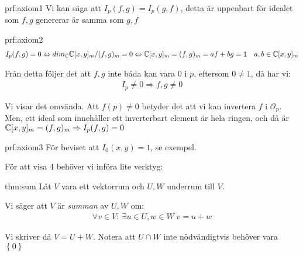 \par\bigskip
\begin{prf}[Axiom 1]{prf:axiom1}
  Vi kan säga att $I_p(f,g) = I_p(g,f)$, detta är uppenbart för idealet som $f,g$ genererar är samma som $g,f$ 
\end{prf}
\par\bigskip
\begin{prf}[Axiom 2]{prf:axiom2}
  \begin{equation*}
    \begin{gathered}
      I_p(f,g) = 0\Leftrightarrow dim_{\mathbb{C}} \mathbb{C}[x,y]_m/(f,g)_m = 0\Leftrightarrow \mathbb{C}[x,y]_m = (f,g)_m = af+bg=1\quad a,b\in\mathbb{C}[x,y]_m
    \end{gathered}
  \end{equation*}\par
  \noindent Från detta följer det att $f,g$ inte båda kan vara 0 i $p$, eftersom $0\neq1$, då har vi:
  \begin{equation*}
    \begin{gathered}
      I_p\neq0 \Rightarrow f,g\neq0
    \end{gathered}
  \end{equation*}
  \par\bigskip
  \noindent Vi visar det omvända. Att $f(p)\neq0$ betyder det att vi kan invertera $f$ i $\mathcal{O}_p$. Men, ett ideal som innehåller ett inverterbart element är hela ringen, och då är $\mathbb{C}[x,y]_m=(f,g)_m\Rightarrow I_p(f,g)=0$
\end{prf}
\par\bigskip
\begin{prf}[Axiom 3]{prf:axiom3}
  För beviset att $I_0(x,y) = 1$, se exempel.
\end{prf}
\par\bigskip
\noindent För att visa 4 behöver vi införa lite verktyg:
\par\bigskip
\begin{theo}[Summa]{thm:sum}
  Låt $V$ vara ett vektorrum och $U, W$ underrum till $V$.
  \par\bigskip
  \noindent Vi säger att $V$ är \textit{summan} av $U,W$ om:
  \begin{equation*}
    \begin{gathered}
      \forall v\in V:\:\exists u\in U,w\in W\; v = u+w
    \end{gathered}
  \end{equation*}\par
\noindent Vi skriver då $V = U+W$. Notera att $U\cap W$ inte nödvändigtvis behöver vara $\left\{0\right\}$ 
\end{theo}
